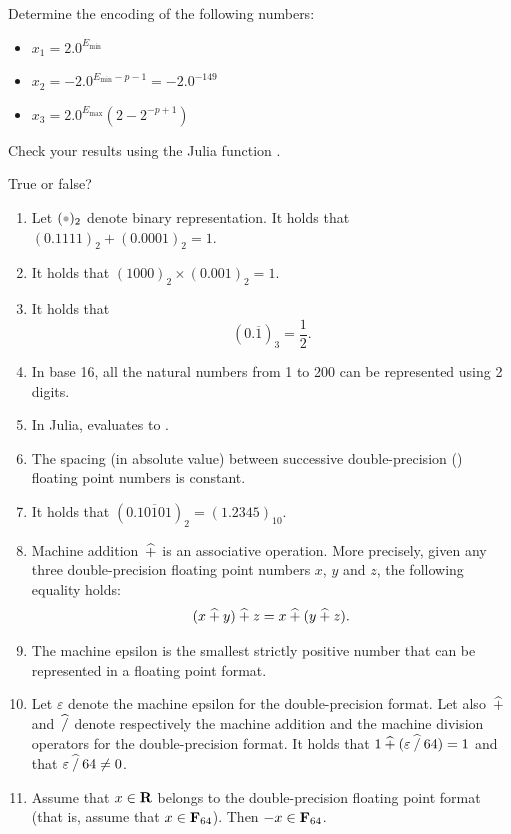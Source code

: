 \begin{exercise}
    Determine the encoding of the following  numbers:
    \begin{itemize}
        \item $x_1 = 2.0^{E_{\min}}$
        \item $x_2 = - 2.0^{E_{\min} - p - 1} = - 2.0^{-149}$
        \item $x_3 =2.0^{E_{\max}} (2-2^{-p+1})$
    \end{itemize}
    Check your results using the Julia function .
\end{exercise}

\begin{exercise}
    [Summary]
    True or false?
    \begin{enumerate}
        \item Let $(\placeholder)_2$ denote binary representation.
            It holds that
            \(
                (0.1111)_2 + (0.0001)_2 = 1.
            \)
        \item It holds that
            \(
                (1000)_2 \times (0.001)_2 = 1.
            \)
        \item It holds that
            \[
                (0.\overline{1})_3 = \frac{1}{2}.
            \]
        \item In base 16, all the natural numbers from 1 to 200 can be represented using 2 digits.
        \item In Julia,  evaluates to .
        \item The spacing (in absolute value) between successive double-precision () floating point numbers is constant.
        \item It holds that $(0.\overline{10101})_2 = (1.2345)_{10}$.
        \item Machine addition~$\mathbin{\widehat +}$ is an associative operation.
            More precisely, given any three double-precision floating point numbers $x$, $y$ and $z$,
            the following equality holds:
            \[
                (x \mathbin{\widehat +} y) \mathbin{\widehat +} z = x \mathbin{\widehat +} (y \mathbin{\widehat +} z).
            \]
        \item
            The machine epsilon is the smallest strictly positive number that can be represented in a floating point format.

        \item
            Let $\varepsilon$ denote the machine epsilon for the double-precision format.
            Let also~$\mathbin{\widehat +}$ and~$\mathbin{\widehat /}$ denote respectively the machine addition and the machine division operators for the double-precision format.
            It holds that $1 \mathbin{\widehat +} (\varepsilon \mathbin{\widehat /} 64) = 1$ and that $\varepsilon \mathbin{\widehat /} 64 \neq 0$.

        \item
            Assume that $x \in \mathbf R$ belongs to the double-precision floating point format (that is,
            assume that $x \in \mathbf F_{64}$).
            Then $-x \in \mathbf F_{64}$.
    \end{enumerate}
\end{exercise}

